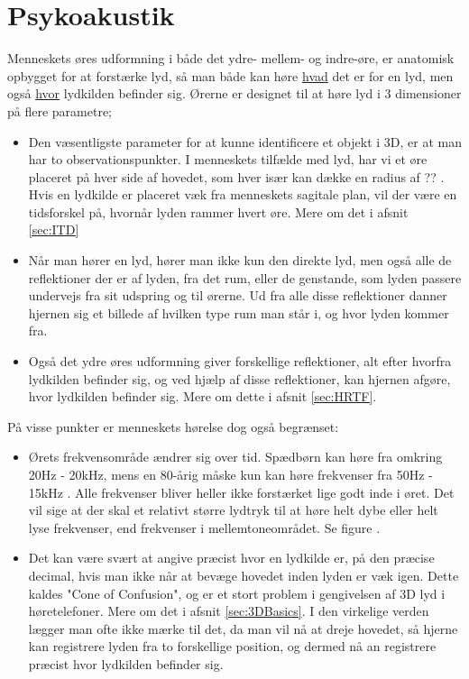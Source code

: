 \chapter{Psykoakustik}

Menneskets øres udformning i både det ydre- mellem- og indre-øre, er anatomisk opbygget for at forstærke lyd, så man både kan høre \underline{hvad} det er for en lyd, men også \underline{hvor} lydkilden befinder sig. Ørerne er designet til at høre lyd i 3 dimensioner på flere parametre;

\begin{itemize}
	\item  Den væsentligste parameter for at kunne identificere et objekt i 3D, er at man har to observationspunkter. I menneskets tilfælde med lyd, har vi et øre placeret på hver side af hovedet, som hver især kan dække en radius af ?? . Hvis en lydkilde er placeret væk fra menneskets sagitale plan, vil der være en tidsforskel på, hvornår lyden rammer hvert øre. Mere om det i afsnit \ref{sec:ITD}

\item  Når man hører en lyd, hører man ikke kun den direkte lyd, men også alle de reflektioner der er af lyden, fra det rum, eller de genstande, som lyden passere undervejs fra sit udspring og til ørerne. Ud fra alle disse reflektioner danner hjernen sig et billede af hvilken type rum man står i, og hvor lyden kommer fra. 

\item  Også det ydre øres udformning giver forskellige reflektioner, alt efter hvorfra lydkilden befinder sig, og ved hjælp af disse reflektioner, kan hjernen afgøre, hvor lydkilden befinder sig. Mere om dette i afsnit \ref{sec:HRTF}.


\end{itemize}

På visse punkter er menneskets hørelse dog også begrænset:

\begin{itemize}
	\item Ørets frekvensområde ændrer sig over tid. Spædbørn kan høre fra omkring 20Hz - 20kHz, mens en 80-årig måske kun kan høre frekvenser fra 50Hz - 15kHz . Alle frekvenser bliver heller ikke forstærket lige godt inde i øret. Det vil sige at der skal et relativt større lydtryk til at høre helt dybe eller helt lyse frekvenser, end frekvenser i mellemtoneområdet. Se figure .
	
	\item Det kan være svært at angive præcist hvor en lydkilde er, på den præcise decimal, hvis man ikke når at bevæge hovedet inden lyden er væk igen. Dette kaldes "Cone of Confusion", og er et stort problem i gengivelsen af 3D lyd i høretelefoner. Mere om det i afsnit \ref{sec:3DBasics}. I den virkelige verden lægger man ofte ikke mærke til det, da man vil nå at dreje hovedet, så hjerne kan registrere lyden fra to forskellige position, og dermed nå an registrere præcist hvor lydkilden befinder sig.
\end{itemize}